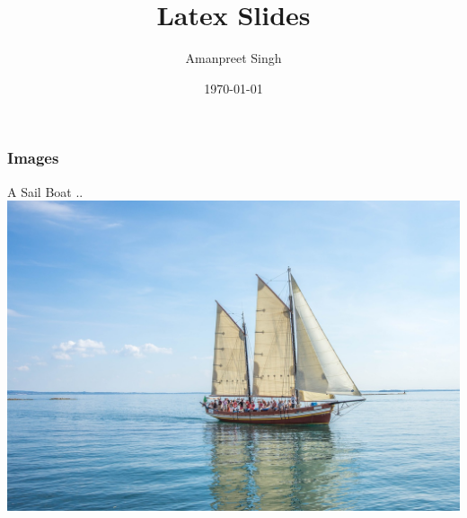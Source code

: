 \documentclass{beamer}
\title{Latex Slides}
\author{Amanpreet Singh}
\date{\today}
\begin{document}
\maketitle

\begin{frame}
    \frametitle{Images}
    A Sail Boat ..
    \includegraphics[width=0.8\linewidth]{boat.jpg}
\end{frame}
\end{document}
